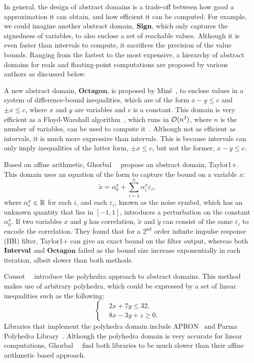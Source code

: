 In general, the design of abstract domains is a trade-off between how good
a approximation it can obtain, and how efficient it can be computed.  For
example, we could imagine another abstract domain, $\mathbf{Sign}$, which only
captures the signedness of variables, to also enclose a set of reachable
values.  Although it is even faster than intervals to compute, it sacrifices
the precision of the value bounds.  Ranging from the fastest to the most
expensive, a hierarchy of abstract domains for reals and floating-point
computations are proposed by various authors as discussed below.

A new abstract domain, $\mathbf{Octagon}$, is proposed by Min\'e~\cite{mine07},
to enclose values in a system of difference-bound inequalities, which are of
the form $x - y \leq c$ and $\pm x \leq c$, where $x$ and $y$ are variables
and $c$ is a constant.  This domain is very efficient as a Floyd-Warshall
algorithm~\cite{floyd62}, which runs in $\operatorname{\mathcal{O}}(n^3)$, where $n$ is the number
of variables, can be used to compute it~\cite{mine04}.  Although not as
efficient as intervals, it is much more expressive than intervals.  This is
because intervals can only imply inequalities of the latter form, $\pm x \leq
c$, but not the former, $x - y \leq c$.

Based on affine arithmetic, Ghorbal~\etal~\cite{ghorbal09} propose an abstract
domain, Taylor1+\@.  This domain uses an equation of the form to capture the
bound on a variable $x$:
\begin{equation}
    \tilde{x} = \alpha^x_0 + \sum_{i = 1}^{n} \alpha^x_i \varepsilon_i,
\end{equation}
where $\alpha^x_i \in \mathbb{R}$ for each $i$, and each $\varepsilon_i$, known
as the noise symbol, which has an unknown quantity that lies in $[-1, 1]$,
introduces a perturbation on the constant $\alpha^x_0$.  If two variables
$x$ and $y$ has correlation, $\tilde{x}$ and $\tilde{y}$ can consist of
the same $\varepsilon_i$ to encode the correlation.  They found that for a
$2^\mathrm{nd}$ order infinite impulse response (IIR) filter, Taylor1+ can
give an exact bound on the filter output, whereas both $\mathbf{Interval}$ and
$\mathbf{Octagon}$ failed as the bound size increase exponentially in each
iteration, albeit slower than both methods.

Cousot~\etal~\cite{cousot78} introduce the polyhedra approach to abstract
domains.  This method makes use of arbitrary polyhedra, which could be
expressed by a set of linear inequalities such as the following:
\begin{equation}
    \left\{
    \begin{aligned}
        & 2x + 7y \leq 32, \\
        & 8x - 3y + z \geq 0.
    \end{aligned}
    \right.
\end{equation}
Libraries that implement the polyhedra domain include APRON~\cite{apron} and
Parma Polyhedra Library~\cite{ppl}.  Although the polyhedra domain is very
accurate for linear computations, Ghorbal~\etal~\cite{ghorbal09} find both
libraries to be much slower than their affine arithmetic based approach.

